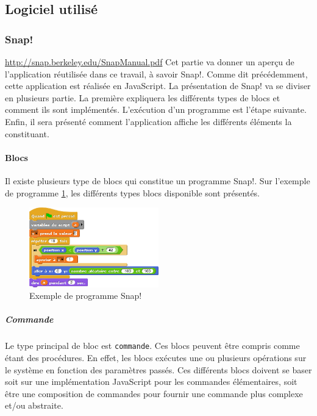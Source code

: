 \subsection{Logiciel utilisé}
\subsubsection{Snap!}
\url{http://snap.berkeley.edu/SnapManual.pdf}
Cet partie va donner un aperçu de l'application réutilisée dans ce travail, à savoir Snap!. Comme dit précédemment, cette application est réalisée en JavaScript. La présentation de Snap! va se diviser en plusieurs partie. La première expliquera les différents types de blocs et comment ils sont implémentés. L'exécution d'un programme est l'étape suivante. Enfin, il sera présenté comment l'application affiche les différents éléments la constituant.

\paragraph{Blocs}
Il existe plusieurs type de blocs qui constitue un programme Snap!. Sur l'exemple de programme \ref{fig:software_used_script}, les différents types blocs disponible sont présentés.
\begin{figure}
  \begin{center}
    \includegraphics[width=0.5\textwidth]{content/4-theory/2-related_work/images/script}
    \caption{Exemple de programme Snap!}
    \label{fig:software_used_script}
  \end{center}
\end{figure}

\subparagraph{Commande}
Le type principal de bloc est \texttt{commande}. Ces blocs peuvent être compris comme étant des procédures. En effet, les blocs exécutes une ou plusieurs opérations sur le système en fonction des paramètres passés. Ces différents blocs doivent se baser soit sur une implémentation JavaScript pour les commandes élémentaires, soit être une composition de commandes pour fournir une commande plus complexe et/ou abstraite.

